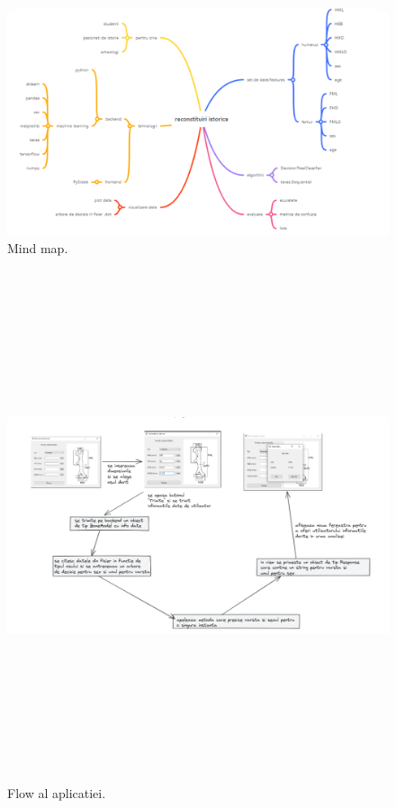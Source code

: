 \documentclass[runningheads,a4paper,11pt]{report}
\begin{document}
\begin{figure}
\centerline{\includegraphics[width=23cm]{Imagini/mind-map.PNG}}
\caption{Mind map.}
\label{fig}
\end{figure}

\begin{figure}
\centerline{\includegraphics[width=22cm,height=15cm]{Imagini/flow.PNG}}
\caption{Flow al aplicatiei.}
\label{fig}
\end{figure}
\end{document}
